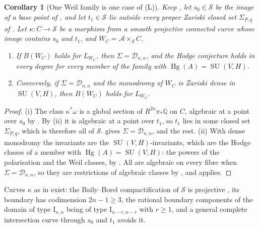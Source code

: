 \documentclass[11pt,reqno]{amsart}
\theoremstyle{plain}
\newtheorem{corollary}[theorem]{Corollary}
\theoremstyle{definition}
\theoremstyle{remark}
\newcommand{\QQ}{\mathbb{Q}}
\newcommand{\cA}{\mathcal{A}}
\newcommand{\cD}{\mathcal{D}}
\newcommand{\cS}{\mathcal{S}}
\DeclareMathOperator{\Hg}{Hg}
\DeclareMathOperator{\SU}{SU}
\begin{document}
\begin{corollary}[One Weil family is one case of \textup{(L)}]
\label{cor:weilequiv}
Keep \cite[Setup~16.1]{paperI}, let $s_{0}\in\cS$ be the image of a base point of
\cite[Theorem~15.27]{paperI}, and let $t_{1}\in\cS$ lie outside every proper
Zariski closed set $\Sigma_{\underline{P},\underline{q}}$ of
\cite[Theorem~16.4]{paperI}. Let $\kappa\colon C\to\cS$ be a morphism from a smooth
projective connected curve whose image contains $s_{0}$ and $t_{1}$, and
$W_{C}=\cA\times_{\cS}C$.
\begin{enumerate}[label=\textup{(\roman*)},leftmargin=2.6em,itemsep=2pt]
\item If $B(W_{C})$ holds for $L_{W_{C}}$, then $\Sigma=\cD_{n,n}$, and the
  Hodge conjecture holds in every degree for every member of the family with
  $\Hg(A)=\SU(V,H)$.
\item Conversely, if $\Sigma=\cD_{n,n}$ and the monodromy of $W_{C}$ is Zariski
  dense in $\SU(V,H)$, then $B(W_{C})$ holds for $L_{W_{C}}$.
\end{enumerate}
\end{corollary}

\begin{proof}
(i) The class $\kappa^{*}\omega$ is a global section of
$R^{2n}\pi_{*}\QQ$ on $C$, algebraic at a point over $s_{0}$ by
\cite[Theorem~15.27]{paperI}. By (ii) it is algebraic
at a point over $t_{1}$, so $t_{1}$ lies in some closed set
$\Sigma_{\underline{P},\underline{q}}$, which is therefore all of $\cS$.
\cite[Theorem~16.4]{paperI} gives $\Sigma=\cD_{n,n}$, and \cite[Theorem~15.14(a)]{paperI}
the rest. (ii) With dense monodromy the invariants are the
$\SU(V,H)$-invariants, which are the Hodge classes of a member with
$\Hg(A)=\SU(V,H)$: the powers of the polarisation and the Weil classes, by
\cite[Theorem~4.14]{paperI}. All are algebraic on every fibre when
$\Sigma=\cD_{n,n}$, so they are restrictions of algebraic classes by
, and  applies.
\end{proof}

Curves $\kappa$ as in  exist: the Baily--Borel
compactification of $\cS$ is projective \cite{BB66}, its boundary has
codimension $2n-1\ge3$, the rational boundary components of the domain of type
$\mathrm{I}_{n,n}$ being of type $\mathrm{I}_{n-r,n-r}$ with $r\ge1$, and a
general complete intersection curve through $s_{0}$ and $t_{1}$ avoids it.
\end{document}
